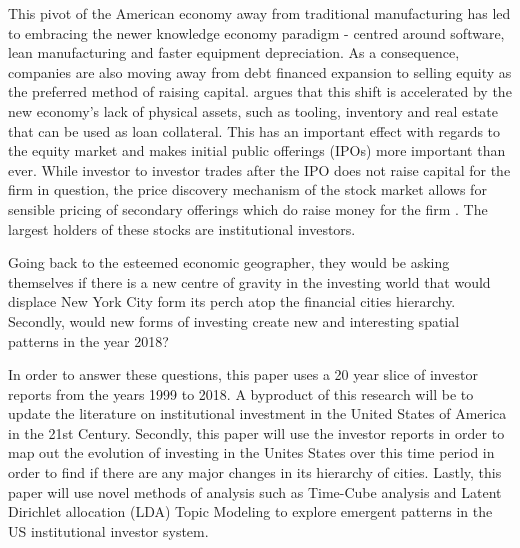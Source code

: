 This pivot of the American economy away from traditional manufacturing has led to embracing the newer knowledge economy paradigm - centred around software, lean manufacturing and faster equipment depreciation.  As a consequence, companies are also moving away from debt financed expansion to selling equity as the preferred method of raising capital. 	\cite{Graves2003} argues that this shift is accelerated by the new economy's lack of physical assets, such as tooling, inventory and real estate that can be used as loan collateral. This has an important effect with regards to the equity market and makes initial public offerings (IPOs) more important than ever. While investor to investor trades after the IPO does not raise capital for the firm in question, the price discovery mechanism of the stock market allows for sensible pricing of secondary offerings which do raise money for the firm \citep{Tobin1969}. The largest holders of these stocks are institutional investors.

Going back to the esteemed economic geographer, they would be asking themselves if there is a new centre of gravity in the investing world that would displace New York City form its perch atop the financial cities hierarchy.   Secondly, would new forms of investing create new and interesting spatial patterns in the year 2018?  

In order to answer these questions, this paper uses a 20 year slice of investor reports from the years 1999 to 2018.  A byproduct of this research will be to  update the literature on institutional investment in the United States of America in the 21st Century.  Secondly, this paper will use the investor reports in order to map out the evolution of investing in the Unites States over this time period in order to find if there are any major changes in its hierarchy of cities.  Lastly, this paper will use novel methods of analysis such as Time-Cube analysis and Latent Dirichlet allocation (LDA) Topic Modeling to explore emergent patterns in the US institutional investor system.  

